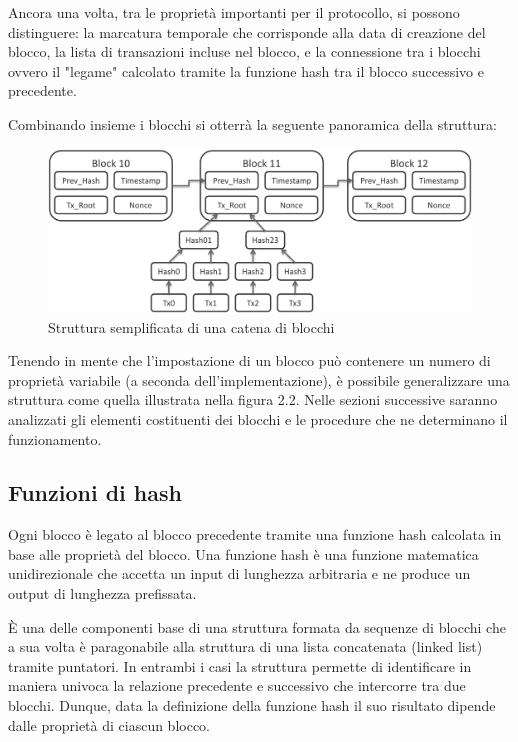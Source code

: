 Ancora una volta, tra le proprietà importanti per il protocollo, si possono distinguere: la marcatura temporale che corrisponde alla data di creazione del blocco, la lista di transazioni incluse nel blocco, e la connessione tra i blocchi ovvero il "legame" calcolato tramite la funzione hash tra il blocco successivo e precedente.

Combinando insieme i blocchi si otterrà la seguente panoramica della struttura:

\begin{figure}[H]
\centering
\includegraphics[width=1\textwidth]{immagini/bitcoinblocks.png}
\caption{Struttura semplificata di una catena di blocchi}
\label{fig:mesh2}

\end{figure}

Tenendo in mente che l'impostazione di un blocco può contenere un numero di proprietà variabile (a seconda dell'implementazione), è possibile generalizzare una struttura come quella illustrata nella figura 2.2. Nelle sezioni successive saranno analizzati gli elementi costituenti dei blocchi e le procedure che ne determinano il funzionamento.

\subsection{Funzioni di hash}

Ogni blocco è legato al blocco precedente tramite una funzione hash calcolata in base alle proprietà del blocco. Una funzione hash è una funzione matematica unidirezionale che accetta un input di lunghezza arbitraria e ne produce un output di lunghezza prefissata.

È una delle componenti base di una struttura formata da sequenze di blocchi che a sua volta è paragonabile alla struttura di una lista concatenata (linked list) tramite puntatori. In entrambi i casi la struttura permette di identificare in maniera univoca la relazione precedente e successivo che intercorre tra due blocchi. Dunque, data la definizione della funzione hash il suo risultato dipende dalle proprietà di ciascun blocco.

